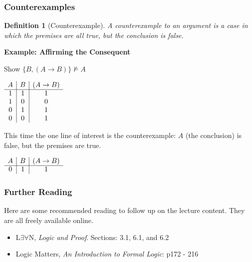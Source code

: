 \documentclass{beamer}
\theoremstyle{indentDefn} \newtheorem{defn}[]{Definition}
\begin{document}
\begin{frame}
	\frametitle{Counterexamples}
	
	\begin{defn}[Counterexample] A counterexample to an argument is a case in which the premises are all true, but the conclusion is false. \end{defn}
	
	
	{\bf Example: Affirming the Consequent} 
	
	Show $\{B, (A \rightarrow B)\} \nvDash A$
	
	\begin{center}
		$\begin{array}{ c | c | c }			
			A & B & (A\rightarrow B)\\
			\cline{1 - 3}
			1 & 1 & 1 \\ 
			1 & 0 & 0\\
			0 & 1 & 1\\
			0 & 0 & 1	
		\end{array}$
	\end{center}

This time the one line of interest is the counterexample: $A$ (the conclusion) is false, but the premises are true. 
	
	\begin{center}
		$\begin{array}{ c | c | c }			
			A & B & (A\rightarrow B)\\
			\cline{1 - 3}
			0 & 1 & 1 \\ 	
		\end{array}$
	\end{center}	
	
\end{frame}

\begin{frame}
  \frametitle{Further Reading}

  Here are some recommended reading to follow up on the lecture content. They are all freely available online. 

	\vspace{0.5cm}

	\begin{itemize}
		\item L$\exists \forall$N, \emph{Logic and Proof}. Sections: 3.1, 6.1, and 6.2 
		\item Logic Matters, \emph{An Introduction to Formal Logic}: p172 - 216
	\end{itemize}

\end{frame}
\end{document}
